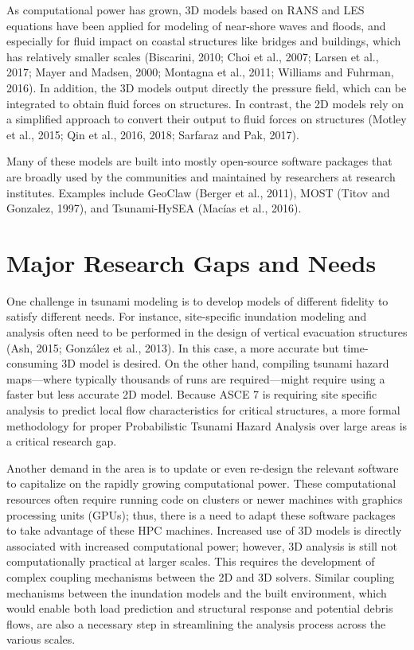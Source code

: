As computational power has grown, 3D models based on RANS and LES equations have been applied for modeling of near-shore waves and floods, and especially for fluid impact on coastal structures like bridges and buildings, which has relatively smaller scales (Biscarini, 2010; Choi et al., 2007; Larsen et al., 2017; Mayer and Madsen, 2000; Montagna et al., 2011; Williams and Fuhrman, 2016). In addition, the 3D models output directly the pressure field, which can be integrated to obtain fluid forces on structures. In contrast, the 2D models rely on a simplified approach to convert their output to fluid forces on structures (Motley et al., 2015; Qin et al., 2016, 2018; Sarfaraz and Pak, 2017). 

Many of these models are built into mostly open-source software packages that are broadly used by the communities and maintained by researchers at research institutes. Examples include GeoClaw (Berger et al., 2011), MOST (Titov and Gonzalez, 1997), and Tsunami-HySEA (Macías et al., 2016).

\section{Major Research Gaps and Needs}
\label{sec:tsunami_gaps}

One challenge in tsunami modeling is to develop models of different fidelity to satisfy different needs. For instance, site-specific inundation modeling and analysis often need to be performed in the design of vertical evacuation structures (Ash, 2015; González et al., 2013). In this case, a more accurate but time-consuming 3D model is desired. On the other hand, compiling tsunami hazard maps—where typically thousands of runs are required—might require using a faster but less accurate 2D model.  Because ASCE 7 is requiring site specific analysis to predict local flow characteristics for critical structures, a more formal methodology for proper Probabilistic Tsunami Hazard Analysis over large areas is a critical research gap.

Another demand in the area is to update or even re-design the relevant software to capitalize on the rapidly growing computational power. These computational resources often require running code on clusters or newer machines with graphics processing units (GPUs); thus, there is a need to adapt these software packages to take advantage of these HPC machines.  Increased use of 3D models is directly associated with increased computational power; however, 3D analysis is still not computationally practical at larger scales.  This requires the development of complex coupling mechanisms between the 2D and 3D solvers.  Similar coupling mechanisms between the inundation models and the built environment, which would enable both load prediction and structural response and potential debris flows, are also a necessary step in streamlining the analysis process across the various scales.  

%
